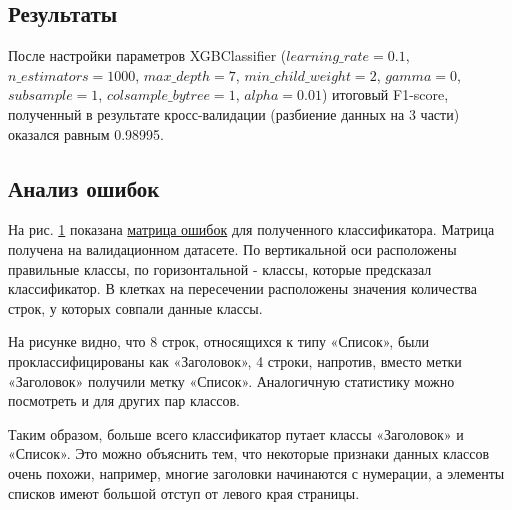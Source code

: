 \documentclass{ProcISPRAS}
\begin{document}
\subsection{Результаты}

После настройки параметров XGBClassifier \cite{tuning} ($learning\_rate=0.1$, $n\_estimators=1000$, $max\_depth=7$, $min\_child\_weight=2$,
$gamma=0$, $subsample=1$, $colsample\_bytree=1$, $alpha=0.01$) итоговый F1-score, полученный в результате кросс-валидации (разбиение данных на 3 части) оказался равным 0.98995. 

\subsection{Анализ ошибок}

На рис. \ref{fig:confusion_matrix} показана \href{https://en.wikipedia.org/wiki/Confusion_matrix}{матрица ошибок} для полученного классификатора. Матрица получена на валидационном датасете. По вертикальной оси расположены правильные классы, по горизонтальной - классы, которые предсказал классификатор. В клетках на пересечении расположены значения количества строк, у которых совпали данные классы.

\begin{figure}[ht]
    \label{fig:confusion_matrix}
\end{figure}

На рисунке видно, что 8 строк, относящихся к типу «Список», были проклассифицированы как «Заголовок», 4 строки, напротив, вместо метки «Заголовок» получили метку «Список». Аналогичную статистику можно посмотреть и для других пар классов.

Таким образом, больше всего классификатор путает классы «Заголовок» и «Список». Это можно объяснить тем, что некоторые признаки данных классов очень похожи, например, многие заголовки начинаются с нумерации, а элементы списков имеют большой отступ от левого края страницы.
\end{document}
